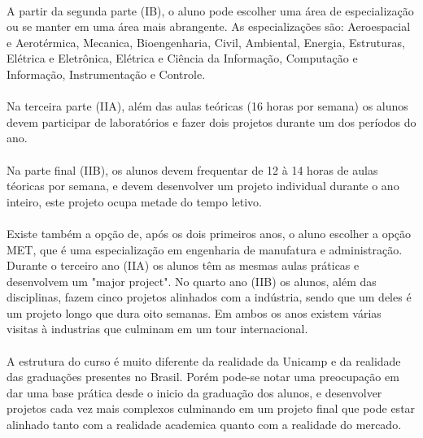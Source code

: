\documentclass[12pt]{article} %
\begin{document}
\paragraph{} A partir da segunda parte (IB), o aluno pode escolher uma área de especialização ou se manter em uma área mais abrangente. As especializações são: Aeroespacial e Aerotérmica, Mecanica, Bioengenharia, Civil, Ambiental, Energia, Estruturas, Elétrica e Eletrônica, Elétrica e Ciência da Informação, Computação e Informação, Instrumentação e Controle.

\paragraph{} Na terceira parte (IIA), além das aulas teóricas (16 horas por semana) os alunos devem participar de laboratórios e fazer dois projetos durante um dos períodos do ano.

\paragraph{} Na parte final (IIB), os alunos devem frequentar de 12 à 14 horas de aulas téoricas por semana, e devem desenvolver um projeto individual durante o ano inteiro, este projeto ocupa metade do tempo letivo.

\paragraph{} Existe também a opção de, após os dois primeiros anos, o aluno escolher a opção MET, que é uma especialização em engenharia de manufatura e administração. Durante o terceiro ano (IIA) os alunos têm as mesmas aulas práticas e desenvolvem um "major project". No quarto ano (IIB) os alunos, além das disciplinas, fazem cinco projetos alinhados com a indústria, sendo que um deles é um projeto longo que dura oito semanas. Em ambos os anos existem várias visitas à industrias que culminam em um tour internacional.

\paragraph{} A estrutura do curso é muito diferente da realidade da Unicamp e da realidade das graduações presentes no Brasil. Porém pode-se notar uma preocupação em dar uma base prática desde o inicio da graduação dos alunos, e desenvolver projetos cada vez mais complexos culminando em um projeto final que pode estar alinhado tanto com a realidade academica quanto com a realidade do mercado. 
\end{document}

